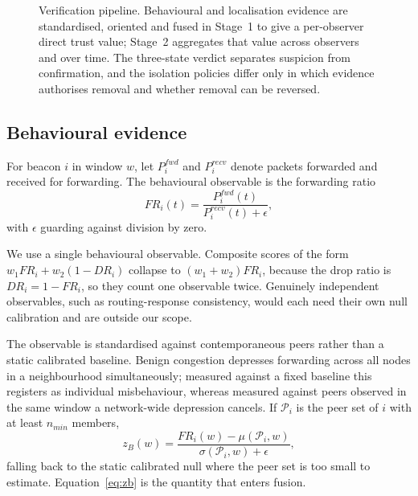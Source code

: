 \documentclass[pdflatex,sn-mathphys-num]{sn-jnl}%
\theoremstyle{thmstyleone}%
\theoremstyle{thmstyletwo}%
\theoremstyle{thmstylethree}%
\begin{document}
\begin{figure}[!t]
{}
\caption{Verification pipeline. Behavioural and localisation evidence are
standardised, oriented and fused in Stage~1 to give a per-observer direct
trust value; Stage~2 aggregates that value across observers and over time.
The three-state verdict separates suspicion from confirmation, and the
isolation policies differ only in which evidence authorises removal and
whether removal can be reversed.}
\label{fig:pipeline}
\end{figure}

\subsection{Behavioural evidence}

For beacon $i$ in window $w$, let $P_i^{fwd}$ and $P_i^{recv}$ denote packets
forwarded and received for forwarding. The behavioural observable is the
forwarding ratio
\begin{equation}
\label{eq:fr}
FR_i(t) = \frac{P_i^{fwd}(t)}{P_i^{recv}(t) + \epsilon},
\end{equation}
with $\epsilon$ guarding against division by zero.

We use a single behavioural observable. Composite scores of the form
$w_1 FR_i + w_2(1-DR_i)$ collapse to $(w_1 + w_2) FR_i$, because the drop ratio
is $DR_i = 1 - FR_i$, so they count one observable twice. Genuinely independent
observables, such as routing-response consistency, would each need their own
null calibration and are outside our scope.

The observable is standardised against contemporaneous peers rather than a
static calibrated baseline. Benign congestion depresses forwarding across all
nodes in a neighbourhood simultaneously; measured against a fixed baseline
this registers as individual misbehaviour, whereas measured against peers
observed in the same window a network-wide depression cancels. If
$\mathcal{P}_i$ is the peer set of $i$ with at least $n_{min}$ members,
\begin{equation}
\label{eq:zb}
z_B(w) = \frac{FR_i(w) - \mu(\mathcal{P}_i, w)}{\sigma(\mathcal{P}_i, w) + \epsilon},
\end{equation}
falling back to the static calibrated null where the peer set is too small to
estimate. Equation~\eqref{eq:zb} is the quantity that enters fusion.
\end{document}

